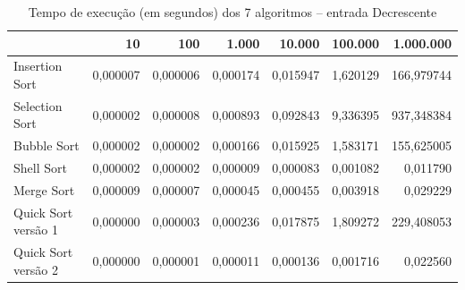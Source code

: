 \begin{table}[htbp]
    \centering
    \begin{tabular}{|l|r|r|r|r|r|r|}
        \hline
         & 10 & 100 & 1.000 & 10.000 & 100.000 & 1.000.000 \\
        \hline
        Insertion Sort & 0,000007 & 0,000006 & 0,000174 & 0,015947 & 1,620129 & 166,979744 \\
        \hline
        Selection Sort & 0,000002 & 0,000008 & 0,000893 & 0,092843 & 9,336395 & 937,348384 \\
        \hline
        Bubble Sort & 0,000002 & 0,000002 & 0,000166 & 0,015925 & 1,583171 & 155,625005 \\
        \hline
        Shell Sort & 0,000002 & 0,000002 & 0,000009 & 0,000083 & 0,001082 & 0,011790 \\
        \hline
        Merge Sort & 0,000009 & 0,000007 & 0,000045 & 0,000455 & 0,003918 & 0,029229 \\
        \hline
        Quick Sort versão 1 & 0,000000 & 0,000003 & 0,000236 & 0,017875 & 1,809272 & 229,408053 \\
        \hline
        Quick Sort versão 2 & 0,000000 & 0,000001 & 0,000011 & 0,000136 & 0,001716 & 0,022560 \\
        \hline
    \end{tabular}
    \caption{Tempo de execução (em segundos) dos 7 algoritmos -- entrada Decrescente}
    \label{tab:comparacao_decrescente}
\end{table}
